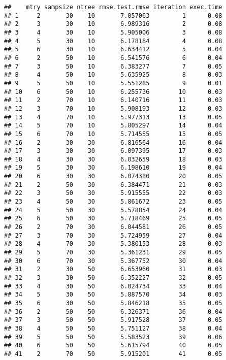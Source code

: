 \documentclass[
]{article}
\begin{document}
\begin{verbatim}
##    mtry sampsize ntree rmse.test.rmse iteration exec.time
## 1     2       30    10       7.057063         1      0.08
## 2     3       30    10       6.989316         2      0.08
## 3     4       30    10       5.905006         3      0.08
## 4     5       30    10       6.178184         4      0.08
## 5     6       30    10       6.634412         5      0.04
## 6     2       50    10       6.541576         6      0.04
## 7     3       50    10       6.383277         7      0.05
## 8     4       50    10       5.635925         8      0.03
## 9     5       50    10       5.551285         9      0.01
## 10    6       50    10       6.255736        10      0.03
## 11    2       70    10       6.140716        11      0.03
## 12    3       70    10       5.908193        12      0.03
## 13    4       70    10       5.977313        13      0.05
## 14    5       70    10       5.805297        14      0.04
## 15    6       70    10       5.714555        15      0.05
## 16    2       30    30       6.816564        16      0.04
## 17    3       30    30       6.097395        17      0.03
## 18    4       30    30       6.032659        18      0.03
## 19    5       30    30       6.198610        19      0.04
## 20    6       30    30       6.074380        20      0.05
## 21    2       50    30       6.384471        21      0.03
## 22    3       50    30       5.915555        22      0.03
## 23    4       50    30       5.861672        23      0.05
## 24    5       50    30       5.578854        24      0.04
## 25    6       50    30       5.718469        25      0.05
## 26    2       70    30       6.044581        26      0.05
## 27    3       70    30       5.724959        27      0.04
## 28    4       70    30       5.380153        28      0.03
## 29    5       70    30       5.361231        29      0.05
## 30    6       70    30       5.367752        30      0.04
## 31    2       30    50       6.653960        31      0.03
## 32    3       30    50       6.352227        32      0.05
## 33    4       30    50       6.024734        33      0.04
## 34    5       30    50       5.887570        34      0.03
## 35    6       30    50       5.846218        35      0.05
## 36    2       50    50       6.326371        36      0.04
## 37    3       50    50       5.917528        37      0.05
## 38    4       50    50       5.751127        38      0.04
## 39    5       50    50       5.583523        39      0.06
## 40    6       50    50       5.615794        40      0.05
## 41    2       70    50       5.915201        41      0.05

\end{verbatim}
\end{document}
